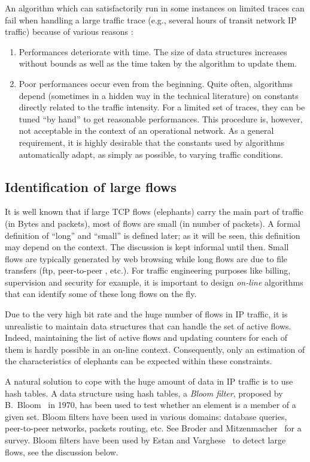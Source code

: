 \documentclass{amsart}
\begin{document}
An algorithm which can satisfactorily run   in some instances on limited traces can fail when handling a large traffic trace (e.g., several hours  of transit network IP
traffic) because of various reasons :
\begin{enumerate}
\item Performances deteriorate with time. The size of data structures increases without
bounds as well as the time taken by the algorithm to update them.
\item Poor performances occur even from the beginning.  Quite often, algorithms depend (sometimes in a
  hidden way  in the technical  literature) on constants  directly related to  the traffic
  intensity.  For a limited set of traces, they can be tuned ``by hand'' to get reasonable
  performances.  This  procedure  is,  however, not acceptable  in  the  context  of  an
  operational network. As a general requirement, it is highly desirable that the
  constants used  by algorithms automatically  adapt, as simply  as possible, to 
  varying traffic conditions.
\end{enumerate}

\subsection*{Identification  of  large flows}
It  is  well  known  that  if large   TCP  flows
(elephants) carry the main part of traffic  (in Bytes and packets), most of flows are small (in number
of packets).  A formal definition of ``long''  and ``small'' is defined later; as it will
be seen, this definition may depend on the  context. The discussion is kept informal until then.  Small
flows are typically generated by web browsing  while long flows are due to file transfers
(ftp, peer-to-peer  , etc.).  For  traffic engineering purposes like  billing, supervision
and security  for example,  it is important  to design  {\em on-line} algorithms  that can
identify some  of these long flows on the fly.

Due to  the very  high bit rate  and the  huge number of  flows in  IP traffic,  it is
unrealistic to maintain  data structures that can handle the set  of active flows. Indeed,
maintaining the  list of active  flows and  updating counters for  each of them  is hardly
possible in an on-line context. Consequently, only an estimation of the characteristics of
elephants can be expected within these constraints. 

A natural solution to cope with the huge amount of data in IP traffic is to
use hash tables.  A data structure using hash tables, a {\em Bloom filter},  proposed by
B.~Bloom~\cite{Bloom} in 1970,  has been used to test whether an element is a member of a
given set.  Bloom filters have been used in various domains: database queries,
peer-to-peer networks, packets routing, etc.  See Broder and Mitzenmacher~\cite{Broder} for
a survey. Bloom filters have been used by Estan and Varghese~\cite{Varghese} to detect
large  flows, see the discussion below.   
\nocite{Azzana:01} 
\end{document}
